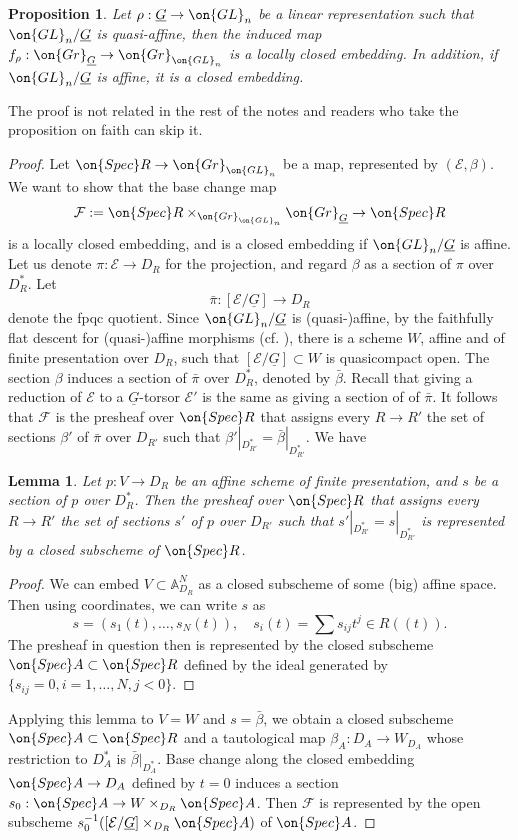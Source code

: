 \documentclass[]{pcmi}
\theoremstyle{plain}
\newtheorem{prop}[equation]{Proposition}
\newtheorem{lem}[equation]{Lemma}
\theoremstyle{remark}
\theoremstyle{definition}
\newcommand{\bA}{{\mathbb A}}
\newcommand{\mE}{{\mathcal E}}
\newcommand{\mF}{{\mathcal F}}
\newcommand{\Gr}{{\on{Gr}}}
\newcommand{\Spec}{\on{Spec}}
\newcommand{\GL}{{\on{GL}}}
\begin{document}
\begin{prop}\label{gen G}
Let $\rho:\underline G\to \GL_n$ be a linear representation such that $\GL_n/\underline G$ is quasi-affine, then the induced map $f_\rho:\Gr_{\underline G}\to \Gr_{\GL_n}$ is a locally closed embedding. In addition, if $\GL_n/\underline G$ is affine, it is a closed embedding.
\end{prop}
The proof is not related in the rest of the notes and readers who take the proposition on faith can skip it.
\begin{proof}
Let $\Spec R\to \Gr_{\GL_n}$ be a map, represented by $(\mE,\beta)$.
We want to show that the base change map 
$$\mF:=\Spec R\times_{\Gr_{\GL_n}}\Gr_{\underline G}\to \Spec R$$ is a locally closed embedding, and is a closed embedding if $\GL_n/\underline G$ is affine. Let us denote $\pi:\mE\to D_R$ for the projection, and regard $\beta$ as a section of $\pi$ over $D^*_R$. Let $$\bar\pi:[\mE/\underline G]\to D_R$$ denote the fpqc quotient. Since $\GL_n/\underline G$ is (quasi-)affine, by the faithfully flat descent for (quasi-)affine morphisms (cf. \cite[Tag0244, Tag0246]{St}), there is a scheme $W$, affine and of finite presentation over $D_R$, such that $[\mE/\underline G]\subset W$ is quasicompact open. The section $\beta$ induces a section of $\bar\pi$ over $D^*_R$, denoted by $\bar\beta$. Recall that giving a reduction of $\mE$ to a $\underline G$-torsor $\mE'$ is the same as giving a section of of $\bar\pi$. It follows that $\mF$ is the presheaf over $\Spec R$ that assigns every $R\to R'$ the set of sections $\beta'$ of $\bar\pi$ over $D_{R'}$ such that $\beta'|_{D^*_{R'}}=\bar\beta|_{D^*_{R'}}$. We have
\begin{lem}
Let $p:V\to D_R$ be an affine scheme of finite presentation, and $s$ be a section of $p$ over $D_R^*$. Then the presheaf over $\Spec R$ that assigns every $R\to R'$ the set of sections $s'$ of $p$ over $D_{R'}$ such that $s'|_{D^*_{R'}}=s|_{D^*_{R'}}$ is represented by a closed subscheme of $\Spec R$.
\end{lem}
\begin{proof}
We can embed $V\subset \bA^N_{D_R}$ as a closed subscheme of some (big) affine space. Then using coordinates, we can write $s$ as
\[s=(s_1(t),\ldots,s_N(t)),\quad s_i(t)=\sum s_{ij}t^{j}\in R((t)).\]
The presheaf in question then is represented by the closed subscheme $\Spec A\subset \Spec R$ defined by the ideal generated by $\{s_{ij}=0, i=1,\ldots,N,j<0\}$.
\end{proof}
Applying this lemma to $V=W$ and $s=\bar\beta$, we obtain a closed subscheme $\Spec A\subset\Spec R$ and a tautological map $\beta_A: D_A\to W_{D_A}$ whose restriction to $D_A^*$ is $\bar\beta|_{D^*_A}$. Base change along the closed embedding $\Spec A\to D_A$ defined by $t=0$ induces a section $s_0:\Spec A\to W\times_{D_R}\Spec A$. Then $\mF$ is represented by the open subscheme $s_0^{-1}([\mE/\underline G]\times_{D_R}\Spec A)$ of $\Spec A$.
\end{proof}
\end{document}
